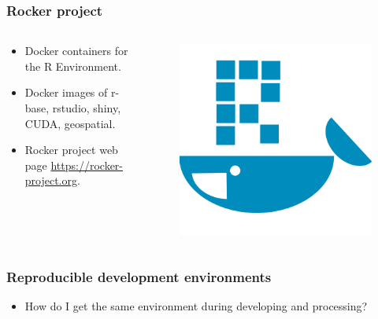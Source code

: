 \documentclass[aspectratio=169]{beamer}
\begin{document}
\begin{frame}
    \frametitle{Rocker project}
    \begin{columns}
        \begin{column}{0.5\textwidth}
            \begin{itemize}
                \item Docker containers for the R Environment.
                \item Docker images of r-base, rstudio, shiny, CUDA,
                    geospatial.
                \item Rocker project web page \url{https://rocker-project.org}.
            \end{itemize}
        \end{column}
        \begin{column}{0.5\textwidth}
            \begin{figure}
                \centering
                \includegraphics[scale=0.25]{logos/rocker.png}
            \end{figure}
        \end{column}
    \end{columns}
\end{frame}

\begin{frame}
    \frametitle{Reproducible development environments}
    \begin{itemize}
        \item How do I get the same environment during developing and 
            processing?
    \end{itemize}
\end{frame}
\end{document}
